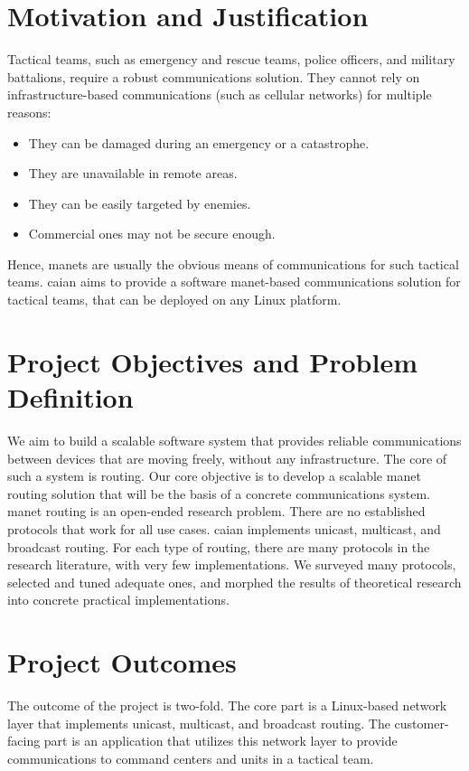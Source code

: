 \section{Motivation and Justification}
Tactical teams, such as emergency and rescue teams, police officers, and military battalions, require a robust communications solution. They cannot rely on infrastructure-based communications (such as cellular networks) for multiple reasons:
\begin{itemize}[itemsep=1pt, topsep=5pt]
    \item They can be damaged during an emergency or a catastrophe.
    \item They are unavailable in remote areas.
    \item They can be easily targeted by enemies.
    \item Commercial ones may not be secure enough.
\end{itemize}
Hence, \acrshort{manets} are usually the obvious means of communications for such tactical teams. \acrshort{caian} aims to provide a software \acrshort{manet}-based communications solution for tactical teams, that can be deployed on any Linux platform.

\section{Project Objectives and Problem Definition}
We aim to build a scalable software system that provides reliable communications between devices that are moving freely, without any infrastructure. The core of such a system is routing. Our core objective is to develop a scalable \acrshort{manet} routing solution that will be the basis of a concrete communications system. \\

\acrshort{manet} routing is an open-ended research problem. There are no established protocols that work for all use cases. \acrshort{caian} implements unicast, multicast, and broadcast routing. For each type of routing, there are many protocols in the research literature, with very few implementations. We surveyed many protocols, selected and tuned adequate ones, and morphed the results of theoretical research into concrete practical implementations.

\section{Project Outcomes}
The outcome of the project is two-fold. The core part is a Linux-based network layer that implements unicast, multicast, and broadcast routing. The customer-facing part is an application that utilizes this network layer to provide communications to command centers and units in a tactical team.

